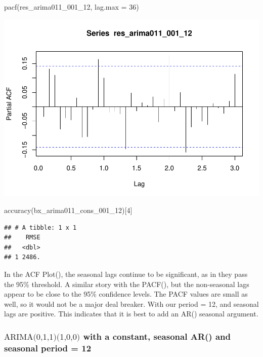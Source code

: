 \documentclass[
]{article}
\newenvironment{Shaded}{\begin{snugshade}}{\end{snugshade}}
\newcommand{\AttributeTok}[1]{\textcolor[rgb]{0.77,0.63,0.00}{#1}}
\newcommand{\DecValTok}[1]{\textcolor[rgb]{0.00,0.00,0.81}{#1}}
\newcommand{\FunctionTok}[1]{\textcolor[rgb]{0.00,0.00,0.00}{#1}}
\newcommand{\NormalTok}[1]{#1}
\begin{document}
\begin{Shaded}
\begin{Highlighting}[]
\FunctionTok{pacf}\NormalTok{(res\_arima011\_001\_12, }\AttributeTok{lag.max =} \DecValTok{36}\NormalTok{)}
\end{Highlighting}
\end{Shaded}

\includegraphics{eighth_meeting_notes_files/figure-latex/arima011 seasonal-2.pdf}

\begin{Shaded}
\begin{Highlighting}[]
\FunctionTok{accuracy}\NormalTok{(bx\_arima011\_cons\_001\_12)[}\DecValTok{4}\NormalTok{]}
\end{Highlighting}
\end{Shaded}

\begin{verbatim}
## # A tibble: 1 x 1
##    RMSE
##   <dbl>
## 1 2486.
\end{verbatim}

In the ACF Plot(), the seasonal lags continue to be significant, as in
they pass the 95\% threshold. A similar story with the PACF(), but the
non-seasonal lags appear to be close to the 95\% confidence levels. The
PACF values are small as well, so it would not be a major deal breaker.
With our period = 12, and seasonal lags are positive. This indicates
that it is best to add an AR() seasonal argument.

\hypertarget{textarima011100-with-a-constant-seasonal-ar-and-seasonal-period-12}{%
\subsubsection{\texorpdfstring{\(\text{ARIMA(0,1,1)(1,0,0)}\) with a
constant, seasonal AR() and seasonal period =
12}{\textbackslash text\{ARIMA(0,1,1)(1,0,0)\} with a constant, seasonal AR() and seasonal period = 12}}\label{textarima011100-with-a-constant-seasonal-ar-and-seasonal-period-12}}
\end{document}
